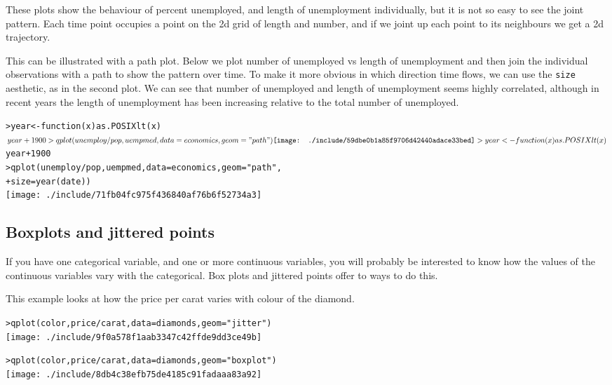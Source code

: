 These plots show the behaviour of percent unemployed, and length of unemployment individually, but it is not so easy to see the joint pattern.  Each time point occupies a point on the 2d grid of length and number, and if we joint up each point to its neighbours we get a 2d trajectory.

This can be illustrated with a path plot.  Below we plot number of unemployed vs length of unemployment and then join the individual observations with a path to show the pattern over time.  To make it more obvious in which direction time flows, we can use the {\tt size} aesthetic, as in the second plot.  We can see that number of unemployed and length of unemployment seems highly correlated, although in recent years the length of unemployment has been increasing relative to the total number of unemployed.

\begin{alltt}
> year <- function(x) as.POSIXlt(x)$year + 1900
> qplot(unemploy/pop, uempmed, data = economics, geom = "path")
\texttt{[image: ./include/59dbe0b1a85f9706d42440adace33bed]}

> year <- function(x) as.POSIXlt(x)$year + 1900
> qplot(unemploy/pop, uempmed, data = economics, geom = "path", 
+     size = year(date))
\texttt{[image: ./include/71fb04fc975f436840af76b6f52734a3]}

\end{alltt}

\subsection{Boxplots and jittered points}\label{sub:boxplot}

If you have one categorical variable, and one or more continuous variables, you will probably be interested to know how the values of the continuous variables vary with the categorical.  Box plots and jittered points offer to ways to do this.  

This example looks at how the price per carat varies with colour of the diamond.

\begin{alltt}
> qplot(color, price/carat, data = diamonds, geom = "jitter")
\texttt{[image: ./include/9f0a578f1aab3347c42ffde9dd3ce49b]}

> qplot(color, price/carat, data = diamonds, geom = "boxplot")
\texttt{[image: ./include/8db4c38efb75de4185c91fadaaa83a92]}

\end{alltt}

